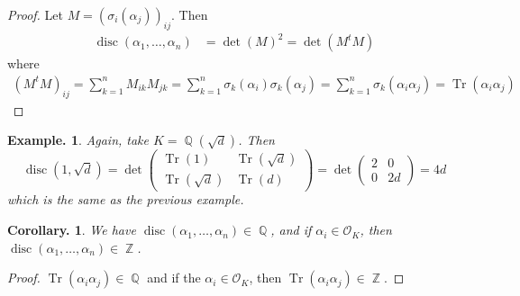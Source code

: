 \documentclass[11pt, a4paper]{memoir}
\DeclareMathOperator{\Q}{{\mathbb{Q}}}
\DeclareMathOperator{\Z}{{\mathbb{Z}}}
\theoremstyle{change}
\newtheorem{corollary}[theorem]{Corollary.}
\theoremstyle{plain}
\theoremstyle{nonumberplain}
\newtheorem{example}{Example.}
\newtheorem{proof}{Proof}
\DeclareMathOperator{\disc}{disc}
\DeclareMathOperator{\Tr}{Tr}
\numberwithin{equation}{section}
\begin{document}
\begin{proof}
    Let $M=(\sigma_i(\alpha_j))_{ij}$.
    Then
    \begin{align*}
        \disc(\alpha_1,\ldots,\alpha_n) &= \det(M)^2 = \det(M^tM)
    \end{align*}
    where
    \begin{align*}
        \left(M^tM\right)_{ij} =\sum_{k=1}^n M_{ik}M_{jk}=\sum_{k=1}^n\sigma_k(\alpha_i)\sigma_k(\alpha_j)=\sum_{k=1}^n\sigma_k(\alpha_i\alpha_j)=\Tr(\alpha_i\alpha_j)
    \end{align*}
\end{proof}
\begin{example}
    Again, take $K=\Q(\sqrt{d})$.
    Then
    \begin{equation*}
        \disc(1,\sqrt{d})=\det\begin{pmatrix}\Tr(1)&\Tr(\sqrt{d})\\\Tr(\sqrt{d})&\Tr(d)\end{pmatrix}=\det\begin{pmatrix}2&0\\0&2d\end{pmatrix}=4d
    \end{equation*}
    which is the same as the previous example.
\end{example}
\begin{corollary}
    We have $\disc(\alpha_1,\ldots,\alpha_n)\in\Q$, and if $\alpha_i\in\mathcal{O}_K$, then $\disc(\alpha_1,\ldots,\alpha_n)\in\Z$.
\end{corollary}
\begin{proof}
    $\Tr(\alpha_i\alpha_j)\in\Q$ and if the $\alpha_i\in\mathcal{O}_K$, then $\Tr(\alpha_i\alpha_j)\in\Z$.
\end{proof}
\end{document}
